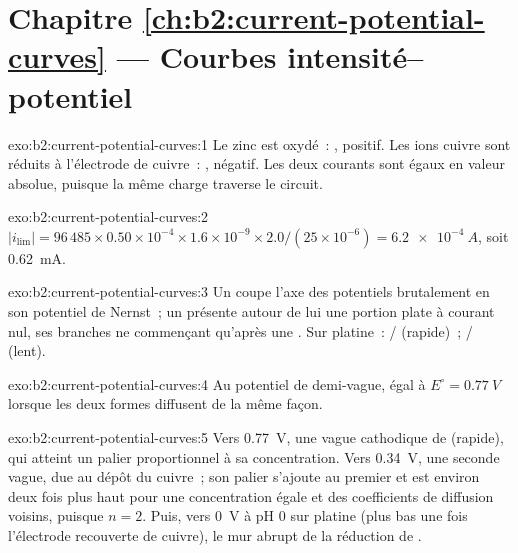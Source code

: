 \section*{Chapitre \ref{ch:b2:current-potential-curves} --- Courbes intensité--potentiel}

\begin{solution}{exo:b2:current-potential-curves:1}
Le zinc est oxydé~: , positif. Les ions cuivre sont réduits à
l'électrode de cuivre~: , négatif. Les deux courants sont égaux en
valeur absolue, puisque la même charge traverse le circuit.
\end{solution}

\begin{solution}{exo:b2:current-potential-curves:2}
$|i_{\lim}| = 96\,485 \times 0.50 \times 10^{-4} \times 1.6 \times 10^{-9} \times
2.0/(25 \times 10^{-6}) = \qty{6.2e-4}{A}$, soit \qty{0.62}{mA}.
\end{solution}

\begin{solution}{exo:b2:current-potential-curves:3}
Un  coupe l'axe des potentiels brutalement en son potentiel de Nernst~; un  présente autour de lui une portion plate à courant nul, ses branches ne commençant
qu'après une . Sur platine~: / (rapide)~;
/ (lent).
\end{solution}

\begin{solution}{exo:b2:current-potential-curves:4}
Au potentiel de demi-vague, égal à $E^\circ = \qty{0.77}{V}$ lorsque les deux formes
diffusent de la même façon.
\end{solution}

\begin{solution}{exo:b2:current-potential-curves:5}
Vers \qty{0.77}{V}, une vague cathodique de  (rapide), qui atteint un palier
proportionnel à sa concentration. Vers \qty{0.34}{V}, une seconde vague, due au dépôt du
cuivre~; son palier s'ajoute au premier et est environ deux fois plus haut pour une concentration
égale et des coefficients de diffusion voisins, puisque $n = 2$. Puis, vers
\qty{0}{V} à pH 0 sur platine (plus bas une fois l'électrode recouverte de cuivre),
le mur abrupt de la réduction de .
\end{solution}

